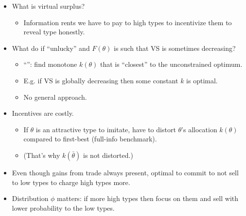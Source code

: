 \documentclass[english,handout,10pt]{beamer}		%
\def\lyxframeend{} %
\begin{document}
\begin{itemize}
	\item What is virtual surplus?
	\begin{itemize}
		\item Information rents we have to pay to high types to incentivize them to reveal type honestly.
	\end{itemize}
	\item What do if ``unlucky'' and $F(\theta)$ is such that VS is sometimes decreasing?
	\begin{itemize}
		\item ``'': find monotone $k(\theta)$ that is ``closest'' to the unconstrained optimum.
		\item E.g. if VS is globally decreasing then some constant $k$ is optimal.
		\item No general approach.
	\end{itemize}
\end{itemize}
\lyxframeend


\begin{itemize}
	\item Incentives are costly.
	\begin{itemize}
		\item If $\theta$ is an attractive type to imitate, have to distort $\theta$'s allocation $k(\theta)$ compared to first-best (full-info benchmark).
		\item (That's why $k(\bar{\theta})$ is not distorted.)
	\end{itemize}
	\item Even though gains from trade always present, optimal to commit to not sell to low types to charge high types more.
	\item Distribution $\phi$ matters: if more high types then focus on them and sell with lower probability to the low types.
\end{itemize}
\lyxframeend
\end{document}
